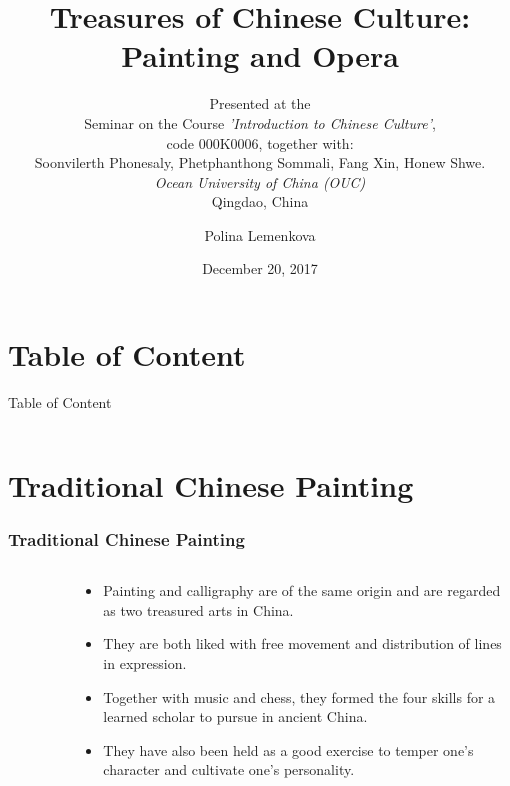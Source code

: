 \documentclass[pdflatex,compress,8pt,
	xcolor={dvipsnames,dvipsnames,svgnames,x11names,table},
	hyperref={	
	breaklinks = true, 
	pdfauthor={Lemenkova Polina}, 
	pdfsubject={Preentation}, 
	pdfcreator={Lemenkova Polina}, 
	pdfproducer={Lemenkova Polina}, 
	colorlinks=true,
	linkcolor=NavyBlue, 
	citecolor=NavyBlue, 
	urlcolor = NavyBlue, 
	breaklinks = true}]{beamer}
\title[\textcolor{Maroon4}{Polina Lemenkova} Treasures of Chinese Culture: Painting and Opera. OUC, Qingdao, China, 20/12/2017]{Treasures of Chinese Culture: Painting and Opera}
\subtitle{\small{
Presented at the\\
Seminar on the Course \emph{'Introduction to Chinese Culture'},\\
 code 000K0006, together with: \\
 Soonvilerth Phonesaly, Phetphanthong Sommali, Fang Xin, Honew Shwe.\\
 \emph{Ocean University of China (OUC)}\\
Qingdao, China}
}
\author[Polina Lemenkova]{Polina Lemenkova}
\date{December 20, 2017}
\begin{document}
\begin{frame}
           \titlepage
\end{frame}

\section*{Table of Content}
\begin{frame}{Table of Content}
    \begin{columns}[onlytextwidth,T]
        \begin{column}{.5\textwidth}
            \tiny{\tableofcontents[sections=1-2]}
        \end{column}
        \begin{column}{.5\textwidth}
            \tiny{\tableofcontents[sections=3-5]}
        \end{column}
    \end{columns}
\end{frame}

\section{Traditional Chinese Painting}
\begin{frame}\frametitle{Traditional Chinese Painting}
\begin{minipage}[0.4\textheight]{\textwidth}
		\begin{columns}[T]
			\begin{column}{0.5\textwidth}
			\begin{figure}[H]
				\centering
						\vspace{1mm}
				\end{figure}
			\end{column}
			\begin{column}{0.5\textwidth}
				\vspace{4em} 
				\begin{itemize}
					\item Painting and calligraphy are of the same origin and are regarded as two treasured arts in China.
					\item They are both liked with free movement and distribution of lines in expression.
					\item Together with music and chess, they formed the four skills for a learned scholar to pursue in ancient China.
					\item They have also been held as a good exercise to temper one’s character and cultivate one’s personality.
				\end{itemize}
			\end{column}
		\end{columns}
	\end{minipage}
\end{frame}
\end{document}
